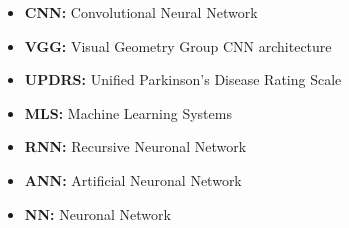 \documentclass[12pt, a4paper]{article}
\begin{document}
	\begin{itemize}
		
		\item[] \textbf{CNN:} Convolutional Neural Network
		
		\item[] \textbf{VGG:} Visual Geometry Group CNN architecture
		
		\item[] \textbf{UPDRS:} Unified Parkinson’s Disease Rating Scale
		
		\item[] \textbf{MLS:} Machine Learning Systems
		
		\item[] \textbf{RNN:} Recursive Neuronal Network
		
		\item[] \textbf{ANN:} Artificial Neuronal Network
		
		\item[] \textbf{NN:} Neuronal Network
		
	\end{itemize}
	
	\clearpage
	
	
	
	
	
\end{document}
